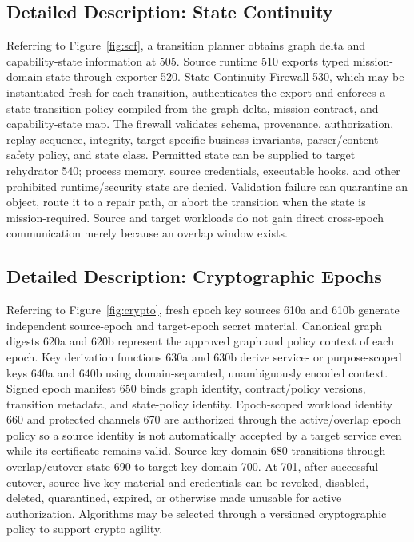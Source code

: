 \documentclass[11pt,letterpaper]{article}
\begin{document}
\subsection{Detailed Description: State Continuity}

Referring to Figure~\ref{fig:scf}, a transition planner obtains graph delta and capability-state information at 505. Source runtime 510 exports typed mission-domain state through exporter 520. State Continuity Firewall 530, which may be instantiated fresh for each transition, authenticates the export and enforces a state-transition policy compiled from the graph delta, mission contract, and capability-state map. The firewall validates schema, provenance, authorization, replay sequence, integrity, target-specific business invariants, parser/content-safety policy, and state class. Permitted state can be supplied to target rehydrator 540; process memory, source credentials, executable hooks, and other prohibited runtime/security state are denied. Validation failure can quarantine an object, route it to a repair path, or abort the transition when the state is mission-required. Source and target workloads do not gain direct cross-epoch communication merely because an overlap window exists.

\subsection{Detailed Description: Cryptographic Epochs}

Referring to Figure~\ref{fig:crypto}, fresh epoch key sources 610a and 610b generate independent source-epoch and target-epoch secret material. Canonical graph digests 620a and 620b represent the approved graph and policy context of each epoch. Key derivation functions 630a and 630b derive service- or purpose-scoped keys 640a and 640b using domain-separated, unambiguously encoded context. Signed epoch manifest 650 binds graph identity, contract/policy versions, transition metadata, and state-policy identity. Epoch-scoped workload identity 660 and protected channels 670 are authorized through the active/overlap epoch policy so a source identity is not automatically accepted by a target service even while its certificate remains valid. Source key domain 680 transitions through overlap/cutover state 690 to target key domain 700. At 701, after successful cutover, source live key material and credentials can be revoked, disabled, deleted, quarantined, expired, or otherwise made unusable for active authorization. Algorithms may be selected through a versioned cryptographic policy to support crypto agility.
\end{document}
